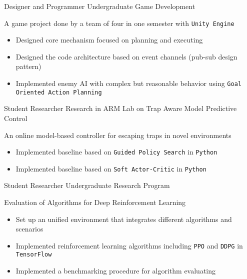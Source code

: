 \documentclass[10pt, a4paper, sans]{moderncv}
\begin{document}
{Designer and Programmer}
{Undergraduate Game Development}
{}{}
{A game project done by a team of four in one semester with \texttt{Unity Engine}
	\begin{itemize}
		\item Designed core mechanism focused on planning and executing
		\item Designed the code architecture based on event channels (pub-sub design pattern)
		\item Implemented enemy AI with complex but reasonable behavior using \texttt{Goal Oriented Action Planning}
	\end{itemize}
}

{Student Researcher}
{Research in ARM Lab on Trap Aware Model Predictive Control}
{}{}
{
	An online model-based controller for escaping traps in novel environments
	\begin{itemize}
		\item Implemented baseline based on \texttt{Guided Policy Search} in \texttt{Python}
		\item Implemented baseline based on \texttt{Soft Actor-Critic} in \texttt{Python}
	\end{itemize}
}


{Student Researcher}
{Undergraduate Research Program}
{}{}
{
	Evaluation of Algorithms for Deep Reinforcement Learning
	\begin{itemize}
		\item Set up an unified environment that integrates different algorithms and scenarios
		\item Implemented reinforcement learning algorithms including \texttt{PPO} and \texttt{DDPG} in \texttt{TensorFlow}
		\item Implemented a benchmarking procedure for algorithm evaluating
	\end{itemize}
}
\end{document}
